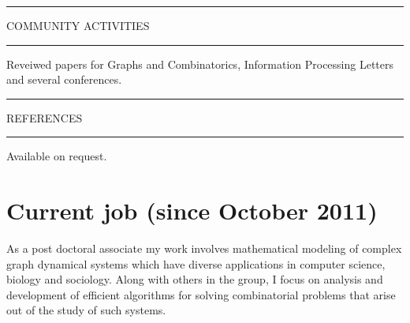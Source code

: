 \documentclass{article}
\begin{document}
\vspace{2mm}\hrule
\begin{center}
\vspace{-2mm}COMMUNITY ACTIVITIES \\
\end{center}
\vspace{-2mm}\hrule\vspace{2mm}
Reveiwed papers for Graphs and Combinatorics, Information Processing
Letters and several conferences.

\vspace{2mm}\hrule
\begin{center}
\vspace{-2mm}REFERENCES \\
\end{center}
\vspace{-2mm}\hrule\vspace{2mm}
Available on request.

\newpage
\section{Current job (since October 2011)}\label{sec:currentJob}
As a post doctoral associate my work involves mathematical modeling
of complex graph dynamical systems which have diverse applications in
computer science, biology and sociology. Along with others in the group,
I focus on analysis and development of efficient algorithms for solving
combinatorial problems that arise out of the study of such systems.
\end{document}
